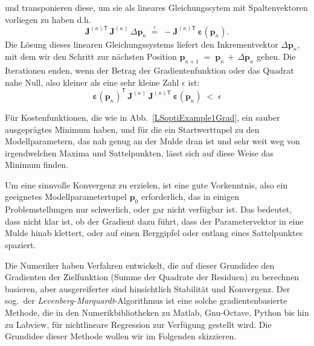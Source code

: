 und transponieren diese, um sie als lineares Gleichungssytem mit Spaltenvektoren vorliegen zu haben
d.h.
\begin{equation}
 \boldsymbol{J}^{(\kappa) \textsf{T}} \, \boldsymbol{J}^{(\kappa)} \, \Delta \mathbf{p}_\kappa
\; \overset{!}{=} \; 
-  \boldsymbol{J}^{(\kappa) \textsf{T}} \, \boldsymbol{\varepsilon}(\mathbf{p}_\kappa) .
\label{GradientQlinGl3}
\end{equation}
Die Lösung dieses linearen Gleichungssystems liefert den Inkrementvektor $\Delta \mathbf{p}_\kappa$,
mit dem wir den Schritt zur nächsten Position $\mathbf{p}_{\kappa+1} \; = \; \mathbf{p}_{\kappa} \, + \,
\Delta \mathbf{p}_{\kappa}$ gehen. Die Iterationen enden, wenn der Betrag der Gradientenfunktion oder
das Quadrat nahe Null, also kleiner als eine sehr kleine Zahl $\epsilon$ ist:
\begin{equation}
 \boldsymbol{\varepsilon}(\mathbf{p}_\kappa)^\mathsf{T}
\, \boldsymbol{J}^{(\kappa)} \, \boldsymbol{J}^{(\kappa) \textsf{T}} \, \boldsymbol{\varepsilon}(\mathbf{p}_\kappa) \;
< \; \epsilon
\end{equation}

Für Kostenfunktionen, die wie in Abb.~\ref{LSoptiExample1Grad}, ein sauber ausgeprägtes Minimum
haben, und für die ein Startwerttupel zu den Modellparametern, das nah genug an der Mulde dran ist und
sehr weit weg von irgendwelchen Maxima und Sattelpunkten, lässt sich auf diese Weise das Minimum
finden.


Um eine sinnvolle Konvergenz zu erzielen, ist eine gute Vorkenntnis, also ein geeignetes 
Modellparametertupel $\mathbf{p}_0$ erforderlich, das in einigen Problemstellungen
nur schwerlich, oder gar nicht verfügbar ist. Das bedeutet, dass nicht klar ist, ob
der Gradient dazu führt, dass der Parametervektor in eine Mulde hinab klettert, oder auf
einen Berggipfel oder entlang eines Sattelpunktes spaziert.

Die Numeriker haben Verfahren entwickelt, die auf dieser Grundidee den Gradienten
der Zielfunktion (Summe der Quadrate der Residuen) zu berechnen
basieren, aber ausgereiferter sind hinsichtlich Stabilität und Konvergenz.
Der sog.\ der \textsl{Levenberg-Marquardt}-Algorithmus ist eine solche gradientenbasierte Methode,
die in den Numerikbibliotheken zu Matlab, Gnu-Octave, Python bis hin zu Labview, für nichtlineare
Regression zur Verfügung gestellt wird. Die Grundidee dieser Methode wollen wir im Folgenden
skizzieren.


